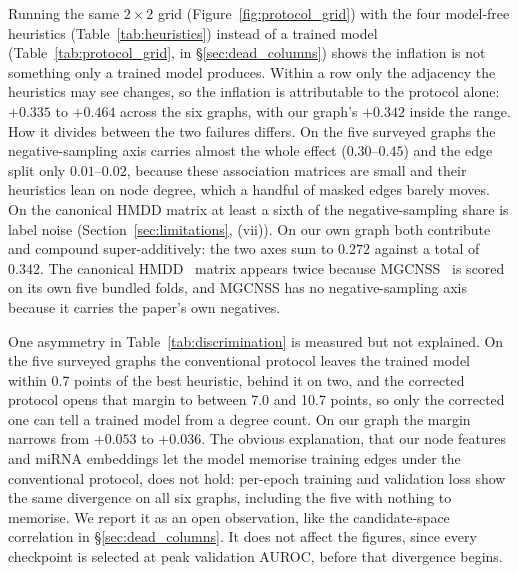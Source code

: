 \documentclass[review]{elsarticle}
\begin{document}


Running the same $2\times2$ grid (Figure~\ref{fig:protocol_grid}) with the four model-free
heuristics (Table~\ref{tab:heuristics}) instead of a trained model
(Table~\ref{tab:protocol_grid}, in \S\ref{sec:dead_columns}) shows the inflation is not something only a trained model
produces. Within a row only the adjacency the heuristics may see changes, so the inflation
is attributable to the protocol alone: $+0.335$ to $+0.464$ across the six graphs, with our
graph's $+0.342$ inside the range. How it divides between the two failures differs. On the
five surveyed graphs the negative-sampling axis carries almost the whole effect
($0.30$--$0.45$) and the edge split only $0.01$--$0.02$, because these association matrices
are small and their heuristics lean on node degree, which a handful of masked edges barely
moves. On the canonical HMDD matrix at least a sixth of the negative-sampling share is label
noise (Section~\ref{sec:limitations}, (vii)). On our own graph both contribute and compound super-additively: the two axes sum to $0.272$ against a total of $0.342$. The
canonical HMDD~\cite{li2014hmdd} matrix appears twice because MGCNSS~\cite{tian2024mgcnss} is scored on its own five bundled folds, and
MGCNSS has no negative-sampling axis because it carries the paper's own negatives.

One asymmetry in Table~\ref{tab:discrimination} is measured but not explained. On the five
surveyed graphs the conventional protocol leaves the trained model within 0.7 points of the
best heuristic, behind it on two, and the corrected protocol opens that margin to between
7.0 and 10.7 points, so only the corrected one can tell a trained model from a degree count.
On our graph the margin narrows from $+0.053$ to $+0.036$. The obvious explanation, that our
node features and miRNA embeddings let the model memorise training edges under the
conventional protocol, does not hold: per-epoch training and validation loss show the same
divergence on all six graphs, including the five with nothing to memorise. We report it as an
open observation, like the candidate-space correlation in \S\ref{sec:dead_columns}. It does
not affect the figures, since every checkpoint is selected at peak validation AUROC, before
that divergence begins.
\end{document}
